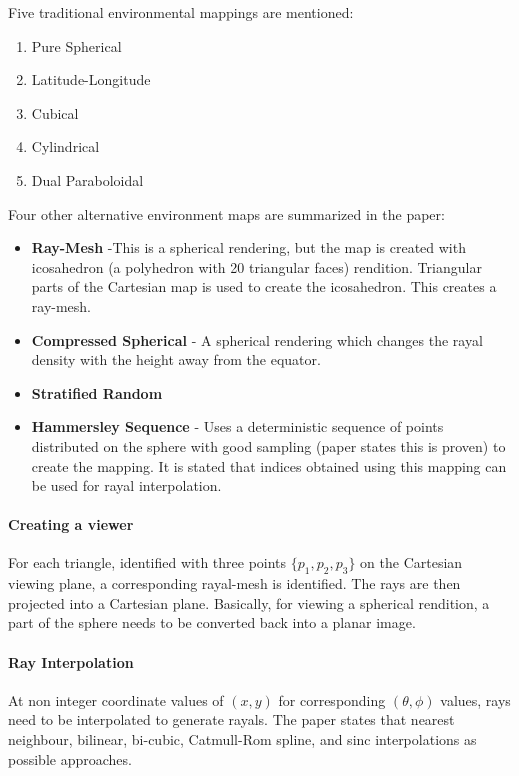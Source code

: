 Five traditional environmental mappings are mentioned:
\begin{enumerate}
\item Pure Spherical
\item  Latitude-Longitude
\item Cubical
\item Cylindrical
\item Dual Paraboloidal
\end{enumerate}

Four other alternative environment maps are summarized in the paper:
\begin{itemize}
\item \textbf{Ray-Mesh} -This is a spherical rendering, but the map is created with icosahedron (a polyhedron with 20 triangular faces) rendition. Triangular parts of the Cartesian map is used to create the icosahedron. This creates a ray-mesh.
\item \textbf{Compressed Spherical} - A spherical rendering which changes the rayal density with the height away from the equator.
\item \textbf{Stratified Random}
\item \textbf{Hammersley Sequence} - Uses a deterministic sequence of points distributed on the sphere with good sampling (paper states this is proven) to create the mapping. It is stated that indices obtained using this mapping can be used for rayal interpolation.
\end{itemize}

\paragraph*{\textbf{Creating a viewer}}
For each triangle, identified with three points $\{p_{1}, p_{2}, p_{3}\}$ on the Cartesian viewing plane, a corresponding rayal-mesh is identified. The rays are then projected into a Cartesian plane. Basically, for viewing a spherical rendition, a part of the sphere needs to be converted back into a planar image.

\paragraph*{\textbf{Ray Interpolation}}
At non integer coordinate values of $(x, y)$ for corresponding $(\theta, \phi)$ values, rays need to be interpolated to generate rayals. The paper states that nearest neighbour, bilinear, bi-cubic, Catmull-Rom spline, and sinc interpolations as possible approaches.


